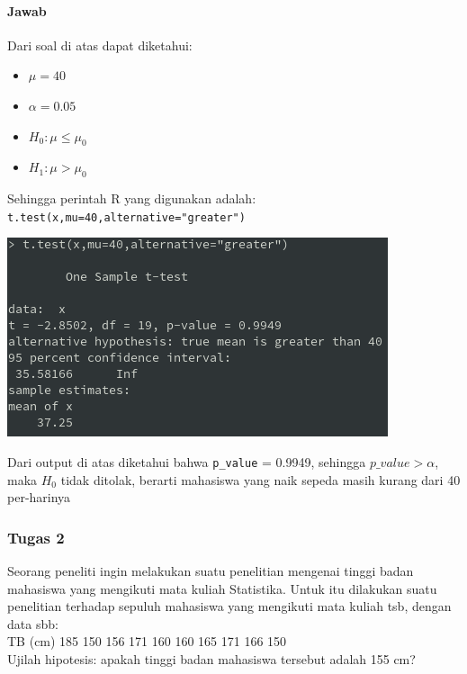 \documentclass[a4paper,12pt]{article}
\begin{document}
\paragraph{Jawab\\}
Dari soal di atas dapat diketahui:
\begin{itemize}
    \item $\mu = 40$
    \item $\alpha = 0.05$
    \item $H_{0} : \mu \leq \mu_{0}$
    \item $H_{1} : \mu > \mu_{0}$
\end{itemize}
Sehingga perintah R yang digunakan adalah:\\
\texttt{t.test(x,mu=40,alternative="greater")}\\
\begin{center}
    \includegraphics[width=0.8\linewidth]{tugas1.png}
\end{center}
Dari output di atas diketahui bahwa \texttt{p\_value} = 0.9949, sehingga $p\_value > \alpha$, maka $H_{0}$ tidak ditolak, berarti mahasiswa yang naik sepeda masih kurang dari 40 per-harinya

\subsubsection{Tugas 2}
Seorang peneliti ingin melakukan suatu penelitian mengenai tinggi badan mahasiswa yang mengikuti mata kuliah Statistika. Untuk itu dilakukan suatu penelitian terhadap sepuluh mahasiswa yang mengikuti mata kuliah tsb, dengan data sbb:\\
TB (cm) 185 150 156 171 160 160 165 171 166 150\\ 
Ujilah hipotesis: apakah tinggi badan mahasiswa tersebut adalah 155 cm?
\end{document}
